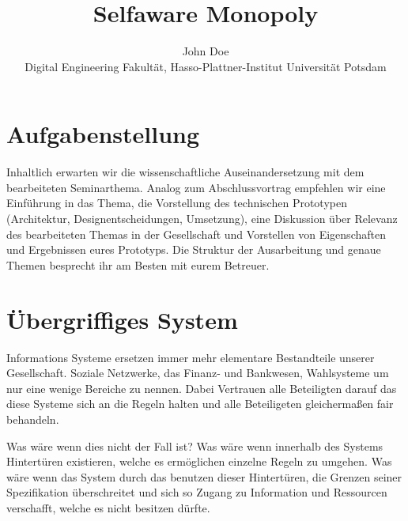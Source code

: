 \documentclass[german]{cgspaper} %
\title{Selfaware Monopoly}
\author{John Doe\\ Digital Engineering Fakultät, Hasso-Plattner-Institut \textbar{} Universität Potsdam}
\begin{document}

\maketitle

\begin{abstract}
\end{abstract}

\copyrightspace %

\section{Aufgabenstellung}
Inhaltlich erwarten wir die wissenschaftliche Auseinandersetzung mit dem bearbeiteten Seminarthema. Analog zum Abschlussvortrag empfehlen wir eine Einführung in das Thema, die Vorstellung des technischen Prototypen (Architektur, Designentscheidungen, Umsetzung), eine Diskussion über Relevanz des bearbeiteten Themas in der Gesellschaft und Vorstellen von Eigenschaften und Ergebnissen eures Prototyps. Die Struktur der Ausarbeitung und genaue Themen besprecht ihr am Besten mit eurem Betreuer.

\section{Übergriffiges System}

Informations Systeme ersetzen immer mehr elementare Bestandteile unserer Gesellschaft.
Soziale Netzwerke, das Finanz- und Bankwesen, Wahlsysteme um nur eine wenige Bereiche zu nennen.
Dabei Vertrauen alle Beteiligten darauf das diese Systeme sich an die Regeln halten und alle Beteiligeten gleichermaßen fair behandeln.

Was wäre wenn dies nicht der Fall ist? 
Was wäre wenn innerhalb des Systems Hintertüren existieren, welche es ermöglichen einzelne Regeln zu umgehen.
Was wäre wenn das System durch das benutzen dieser Hintertüren, die Grenzen seiner Spezifikation überschreitet und sich so Zugang zu Information und Ressourcen verschafft, welche es nicht besitzen dürfte.
\end{document}
